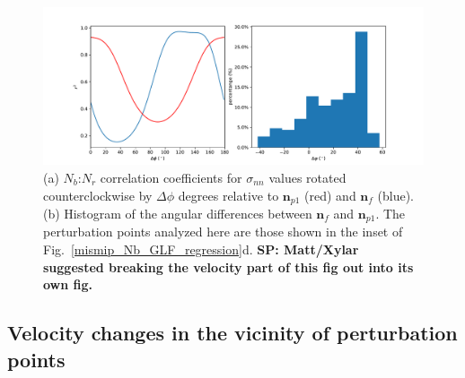\documentclass[review,oneside]{igs}
\begin{document}
\begin{figure}
\centering
\includegraphics[width=1\linewidth]{figs/mismip_r2_all_direction.pdf}
    \caption{(a) $N_b$:$N_r$ correlation coefficients for $\sigma_{nn}$ values rotated counterclockwise by $\Delta\phi$ degrees relative to $\mathbf{n}_{p1}$ (red) and $\mathbf{n}_{f}$ (blue). (b) Histogram of the angular differences between $\mathbf{n}_{f}$ and $\mathbf{n}_{p1}$. The perturbation points analyzed here are those shown in the inset of Fig.~\ref{mismip_Nb_GLF_regression}d. \textbf{SP: Matt/Xylar suggested breaking the velocity part of this fig out into its own fig.}}
    \label{mismip_r2_all_direction}
\end{figure}

\subsection{Velocity changes in the vicinity of perturbation points}
\end{document}
